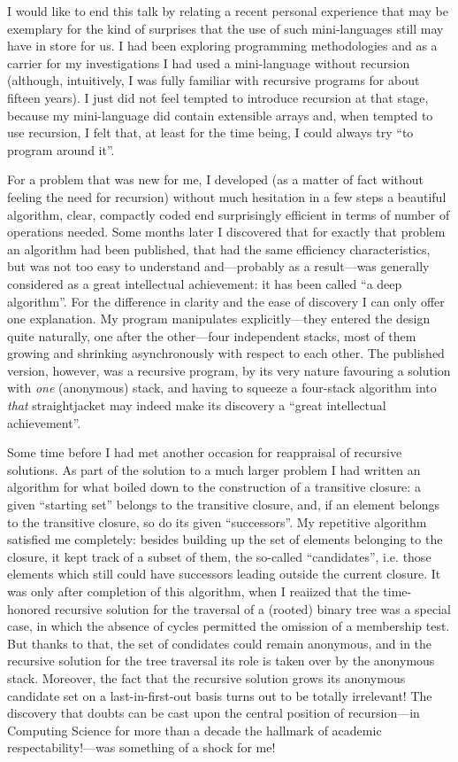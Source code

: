 \documentclass[10pt,letterpaper,twocolumn]{article}
\begin{document}
I would like to end this talk by relating a recent personal experience that may
be exemplary for the kind of surprises that the use of such mini-languages
still may have in store for us. I had been exploring programming methodologies
and as a carrier for my investigations I had used a mini-language without
recursion (although, intuitively, I was fully familiar with recursive programs
for about fifteen years). I just did not feel tempted to introduce recursion at
that stage, because my mini-language did contain extensible arrays and, when
tempted to use recursion, I felt that, at least for the time being, I could
always try ``to program around it''. 

For a problem that was new for me, I developed (as a matter of fact without
feeling the need for recursion) without much hesitation in a few steps a
beautiful algorithm, clear, compactly coded end surprisingly efficient in terms
of number of operations needed. Some months later I discovered that for exactly
that problem an algorithm had been published, that had the same efficiency
characteristics, but was not too easy to understand and---probably as a
result---was generally considered as a great intellectual achievement: it has
been called ``a deep algorithm''. For the difference in clarity and the ease of
discovery I can only offer one explanation. My program manipulates explicitly---they
entered the design quite naturally, one after the other---four
independent stacks, most of them growing and shrinking asynchronously with
respect to each other. The published version, however, was a recursive program,
by its very nature favouring a solution with \emph{one} (anonymous) stack, and having
to squeeze a four-stack algorithm into \emph{that} straightjacket may indeed make its
discovery a ``great intellectual achievement''. 

Some time before I had met another occasion for reappraisal of recursive
solutions. As part of the solution to a much larger problem I had written an
algorithm for what boiled down to the construction of a transitive closure: a
given ``starting set'' belongs to the transitive closure, and, if an element
belongs to the transitive closure, so do its given ``successors''. My repetitive
algorithm satisfied me completely: besides building up the set of elements
belonging to the closure, it kept track of a subset of them, the so-called
``candidates'', i.e. those elements which still could have successors leading
outside the current closure. It was only after completion of this algorithm,
when I reaiized that the time-honored recursive solution for the traversal of
a (rooted) binary tree was a special case, in which the absence of cycles
permitted the omission of a membership test. But thanks to that, the set of
condidates could remain anonymous, and in the recursive solution for the tree
traversal its role is taken over by the anonymous stack. Moreover, the fact
that the recursive solution grows its anonymous candidate set on a
last-in-first-out basis turns out to be totally irrelevant! The discovery that
doubts can be cast upon the central position of recursion---in Computing
Science for more than a decade the hallmark of academic respectability!---was
something of a shock for me! 
\end{document}
